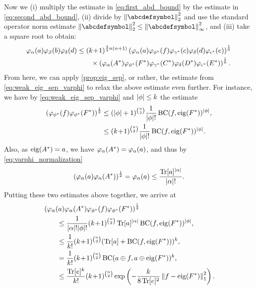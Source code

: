\documentclass[notitlepage, 11pt, letterpaper]{amsart}
\begin{document}
Now we (i) multiply the estimate in \cref{eq:first_abd_bound} by the estimate in \cref{eq:second_abd_bound}, (ii) divide by $\norm{\abcdefsymbol}_{2}^{2}$ and use the standard operator norm estimate $\norm{\abcdefsymbol}_{2}^{2} \leq \norm{\abcdefsymbol}_{\infty}^{2}$, and (iii) take a square root to obtain:
\begin{align}\label{eq:varphi_sixth_root}
    \begin{split}
        \varphi_{\alpha}(a)\varphi_{\beta}(b)\varphi_{\delta}(d)
        &\leq (k\!+\!1)^{\frac{3}{4}n(n+1)}
        \left(
        \varphi_{\alpha}(a)\varphi_{\phi^*}(f)
        \varphi_{\gamma^*}(c)\varphi_{\delta}(d)
        \varphi_{\epsilon^*}(e)
        \right)^{\frac{1}{6}} \\
        &\qquad\times
        \left(\varphi_{\alpha}(A^*)\varphi_{\phi^*}(F^*)\varphi_{\gamma^*}(C^*)\varphi_{\delta}(D^*)\varphi_{\epsilon^*}(E^*)\right)^{\frac{1}{6}}.
    \end{split}
\end{align}
From here, we can apply \cref{prop:eig_sep}, or rather, the estimate from \cref{eq:weak_eig_sep_varphi} to relax the above estimate even further.
For instance, we have by \cref{eq:weak_eig_sep_varphi} and $|\phi| \leq k$ the estimate
\begin{align}
    \begin{split}
        \left(\varphi_{\phi^*}(f) \varphi_{\phi^*}(F^*)\right)^{\frac{1}{2}}
        &\leq (|\phi|+1)^{\binom{n}{2}} \frac{1}{|\phi|!} \operatorname{BC}(f, \operatorname{eig}(F^*))^{|\phi|}, \\
        &\leq (k\!+\!1)^{\binom{n}{2}} \frac{1}{|\phi|!} \operatorname{BC}(f, \operatorname{eig}(F^*))^{|\phi|}.
    \end{split}
\end{align}
Also, as $\operatorname{eig}(A^*)=a$, we have $\varphi_{\alpha}(A^*)=\varphi_\alpha(a)$, and thus by \cref{eq:varphi_normalization}
\begin{equation}
    \left(\varphi_\alpha(a) \varphi_{\alpha}(A^*)\right)^{\frac{1}{2}} =
    \varphi_\alpha(a) \leq \frac{\operatorname{Tr}[a]^{|\alpha|}}{|\alpha|!}.
\end{equation}
Putting these two estimates above together, we arrive at
\begin{align}
    \begin{split}
        &\left( \vp_\ya(\ea) \vp_{\ya}(A^*) \vp_{\yf^*}(\ef) \vp_{\yf^*}(F^*)\right)^{\frac{1}{2}} \\
        &\qquad\leq \frac{1}{\sya!\syf!} \polyk{\binom{n}{2}} \tea^{\sya} \BC(\ef, \eig(F^*))^{\syf}, \\
        &\qquad\leq \frac{1}{k!} \polyk{\binom{n}{2}} (\tea + \BC(\ef, \eig(F^*)))^{k}, \\
        &\qquad= \frac{1}{k!} \polyk{\binom{n}{2}} \BC(\ea \oplus \ef, \ea \oplus \eig(F^*))^k, \\
        &\qquad\leq \frac{\tee^k}{k!} \polyk{\binom{n}{2}} \exp\left( - \frac{k}{8\tee^2} \norm{\ef- \eig(F^*)}_1^2\right).
    \end{split}
\end{align}
\end{document}
